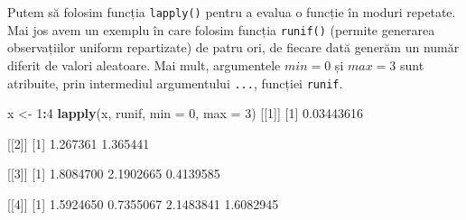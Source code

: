 \documentclass[]{article}
\newenvironment{Shaded}{\begin{snugshade}}{\end{snugshade}}
\newcommand{\KeywordTok}[1]{\textcolor[rgb]{0.13,0.29,0.53}{\textbf{#1}}}
\newcommand{\DataTypeTok}[1]{\textcolor[rgb]{0.13,0.29,0.53}{#1}}
\newcommand{\DecValTok}[1]{\textcolor[rgb]{0.00,0.00,0.81}{#1}}
\newcommand{\FloatTok}[1]{\textcolor[rgb]{0.00,0.00,0.81}{#1}}
\newcommand{\StringTok}[1]{\textcolor[rgb]{0.31,0.60,0.02}{#1}}
\newcommand{\OperatorTok}[1]{\textcolor[rgb]{0.81,0.36,0.00}{\textbf{#1}}}
\newcommand{\NormalTok}[1]{#1}
\begin{document}
\begin{Shaded}
\end{Shaded}

Putem să folosim funcția \texttt{lapply()} pentru a evalua o funcție în
moduri repetate. Mai jos avem un exemplu în care folosim funcția
\texttt{runif()} (permite generarea observațiilor uniform repartizate)
de patru ori, de fiecare dată generăm un număr diferit de valori
aleatoare. Mai mult, argumentele \(min=0\) și \(max=3\) sunt atribuite,
prin intermediul argumentului \texttt{...}, funcției \texttt{runif}.

\begin{Shaded}
\begin{Highlighting}[]
\NormalTok{x <-}\StringTok{ }\DecValTok{1}\OperatorTok{:}\DecValTok{4}
\KeywordTok{lapply}\NormalTok{(x, runif, }\DataTypeTok{min =} \DecValTok{0}\NormalTok{, }\DataTypeTok{max =} \DecValTok{3}\NormalTok{)}
\NormalTok{[[}\DecValTok{1}\NormalTok{]]}
\NormalTok{[}\DecValTok{1}\NormalTok{] }\FloatTok{0.03443616}

\NormalTok{[[}\DecValTok{2}\NormalTok{]]}
\NormalTok{[}\DecValTok{1}\NormalTok{] }\FloatTok{1.267361} \FloatTok{1.365441}

\NormalTok{[[}\DecValTok{3}\NormalTok{]]}
\NormalTok{[}\DecValTok{1}\NormalTok{] }\FloatTok{1.8084700} \FloatTok{2.1902665} \FloatTok{0.4139585}

\NormalTok{[[}\DecValTok{4}\NormalTok{]]}
\NormalTok{[}\DecValTok{1}\NormalTok{] }\FloatTok{1.5924650} \FloatTok{0.7355067} \FloatTok{2.1483841} \FloatTok{1.6082945}
\end{Highlighting}
\end{Shaded}
\end{document}

